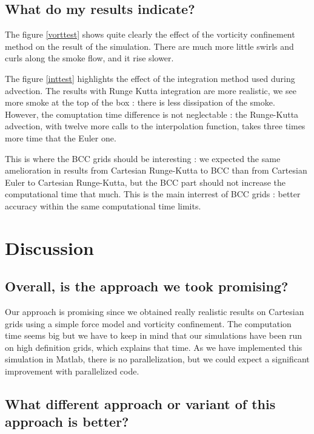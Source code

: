 \documentclass[accepted,single]{gipaper}
\begin{document}
\subsection{What do my results indicate?}

The figure \ref{vorttest} shows quite clearly the effect of the vorticity confinement method on the result of the simulation. There are much more little swirls and curls along the smoke flow, and it rise slower.

The figure \ref{inttest} highlights the effect of the integration method used during advection. The results with Runge Kutta integration are more realistic, we see more smoke at the top of the box : there is less dissipation of the smoke. However, the comuptation time difference is not neglectable : the Runge-Kutta advection, with twelve more calls to the interpolation function, takes three times more time that the Euler one.

This is where the BCC grids should be interesting : we expected the same amelioration in results from Cartesian Runge-Kutta to BCC than from Cartesian Euler to Cartesian Runge-Kutta, but the BCC part should not increase the computational time that much. This is the main interrest of BCC grids : better accuracy within the same computational time limits.


\section{Discussion}

\subsection{Overall, is the approach we took promising?}

Our approach is promising since we obtained really realistic results on Cartesian grids using a simple force model and vorticity confinement. The computation time seems big but we have to keep in mind that our simulations have been run on high definition grids, which explains that time. As we have implemented this simulation in Matlab, there is no parallelization, but we could expect a significant improvement with parallelized code.

\subsection{What different approach or variant of this approach is better?}
\end{document}
